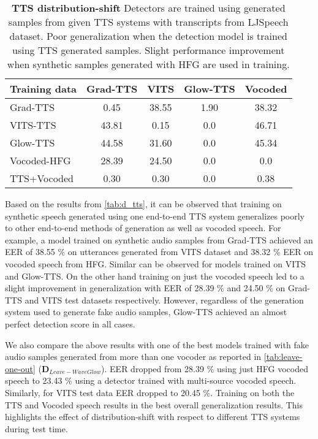 \begin{table}[ht!]
    \caption{\textbf{TTS distribution-shift} Detectors are trained using generated samples from given TTS systems with transcripts from LJSpeech dataset. Poor generalization when the detection model is trained using TTS generated samples. Slight performance improvement when synthetic samples generated with HFG are used in training.}
    \label{tab:d_tts}
    \vskip 0.15in
\begin{center}

\scriptsize
\begin{sc}
    \begin{tabular}{lcccc}
    \toprule
    Training data & Grad-TTS & VITS & Glow-TTS & Vocoded \\ 
    \midrule
      Grad-TTS & 0.45& 38.55 & 1.90 & 38.32\\ 
        \hline
        VITS-TTS &43.81 &0.15  & 0.0 & 46.71 \\ 
        \hline
         Glow-TTS &44.58 & 31.60 & 0.0 & 45.34 \\ 
        \hline
      Vocoded-HFG  &28.39 & 24.50&0.0 & 0.0\\ 
      \hline
      TTS+Vocoded &0.30& 0.30 & 0.0 & 0.38 \\ 
         \bottomrule 
    \end{tabular}
      \end{sc}
\end{center}
\vskip -0.1in
\end{table}

Based on the results from \autoref{tab:d_tts}, it can be observed that training on synthetic speech generated using one end-to-end TTS system generalizes poorly to other end-to-end methods of generation as well as vocoded speech. For example, a model trained on synthetic audio samples from Grad-TTS achieved an EER of 38.55 \% on utterances generated from VITS dataset and 38.32 \% EER on vocoded speech from HFG. Similar can be observed for models trained on VITS and Glow-TTS. On the other hand training on just the vocoded speech led to a slight improvement in generalization with EER of 28.39 \% and 24.50 \% on Grad-TTS and VITS test datasets respectively. However, regardless of the generation system used to generate fake audio samples, Glow-TTS achieved an almost perfect detection score in all cases. 

We also compare the above results with one of the best models trained with fake audio samples generated from more than one vocoder as reported in \autoref{tab:leave-one-out} ($\textbf{D}_{Leave-WaveGlow}$). EER dropped from 28.39 \% using just HFG vocoded speech to 23.43 \% using a detector trained with multi-source vocoded speech. Similarly, for VITS test data EER dropped to 20.45 \%. 
Training on both the TTS and Vocoded speech results in the best overall generalization results. This highlights the effect of distribution-shift with respect to different TTS systems during test time.

